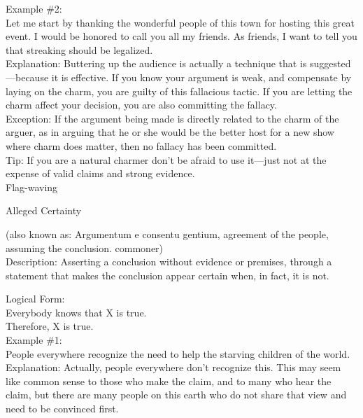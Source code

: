 \documentclass[a4paper,12pt,single,pdftex]{scrartcl}
\begin{document}
    
      Example \#2:
    \\

    
      Let me start by thanking the wonderful people of this town for hosting this great event.  I would be honored to call you all my friends.  As friends, I want to tell you that streaking should be legalized.
    \\

    
      Explanation: Buttering up the audience is actually a technique that is suggested—because it is effective.  If you know your argument is weak, and compensate by laying on the charm, you are guilty of this fallacious tactic.  If you are letting the charm affect your decision, you are also committing the fallacy.
    \\

    
      Exception: If the argument being made is directly related to the charm of the arguer, as in arguing that he or she would be the better host for a new show where charm does matter, then no fallacy has been committed.
    \\

    
      Tip: If you are a natural charmer don’t be afraid to use it—just not at the expense of valid claims and strong evidence.
    \\

  

Flag-waving

Alleged Certainty
    
      (also known as: Argumentum e consentu gentium, agreement of the people, assuming the conclusion. commoner)
    \\

  
    Description: Asserting a conclusion without evidence or premises, through a statement that makes the conclusion appear certain when, in fact, it is not.

    
      Logical Form:
    \\

    
      Everybody knows that X is true.
    \\

    
      Therefore, X is true.
    \\

    
      Example \#1:
    \\

    
      People everywhere recognize the need to help the starving children of the world.
    \\

    
      Explanation: Actually, people everywhere don’t recognize this.  This may seem like common sense to those who make the claim, and to many who hear the claim, but there are many people on this earth who do not share that view and need to be convinced first.
    \\
\end{document}
